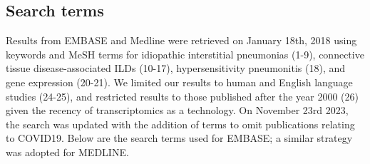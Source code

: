 \documentclass[
]{article}
\begin{document}
\renewcommand{\thefigure}{A2.\arabic{figure}}
\setcounter{figure}{0}
\renewcommand{\thetable}{A2.\arabic{table}}
\setcounter{table}{0}
\renewcommand{\theequation}{A2.\arabic{equation}}
\setcounter{equation}{0}

\subsection{Search terms}\label{search-terms}

Results from EMBASE and Medline were retrieved on January 18th, 2018 using keywords and MeSH terms for idiopathic interstitial pneumonias (1-9), connective tissue disease-associated ILDs (10-17), hypersensitivity pneumonitis (18), and gene expression (20-21). We limited our results to human and English language studies (24-25), and restricted results to those published after the year 2000 (26) given the recency of transcriptomics as a technology. On November 23rd 2023, the search was updated with the addition of terms to omit publications relating to COVID19. Below are the search terms used for EMBASE; a similar strategy was adopted for MEDLINE.
\end{document}
